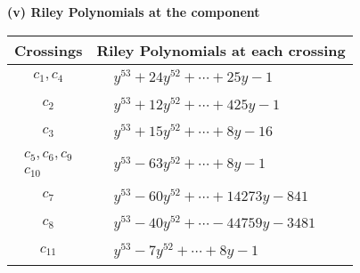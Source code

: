 \documentclass[1p]{elsarticle_modified}
\theoremstyle{definition}
\begin{document}
\newpage\renewcommand{\arraystretch}{1}
\flushleft \textbf{(v) Riley Polynomials at the component}\newline \\
\begin{tabular}{m{50pt}|m{274pt}}
Crossings & \hspace{64pt}Riley Polynomials at each crossing \\
\hline $$\begin{aligned}c_{1},c_{4}\end{aligned}$$&$\begin{aligned}
&y^{53}+24 y^{52}+\cdots+25 y-1
\end{aligned}$\\
\hline $$\begin{aligned}c_{2}\end{aligned}$$&$\begin{aligned}
&y^{53}+12 y^{52}+\cdots+425 y-1
\end{aligned}$\\
\hline $$\begin{aligned}c_{3}\end{aligned}$$&$\begin{aligned}
&y^{53}+15 y^{52}+\cdots+8 y-16
\end{aligned}$\\
\hline $$\begin{aligned}c_{5},c_{6},c_{9}\\c_{10}\end{aligned}$$&$\begin{aligned}
&y^{53}-63 y^{52}+\cdots+8 y-1
\end{aligned}$\\
\hline $$\begin{aligned}c_{7}\end{aligned}$$&$\begin{aligned}
&y^{53}-60 y^{52}+\cdots+14273 y-841
\end{aligned}$\\
\hline $$\begin{aligned}c_{8}\end{aligned}$$&$\begin{aligned}
&y^{53}-40 y^{52}+\cdots-44759 y-3481
\end{aligned}$\\
\hline $$\begin{aligned}c_{11}\end{aligned}$$&$\begin{aligned}
&y^{53}-7 y^{52}+\cdots+8 y-1
\end{aligned}$\\
\hline
\end{tabular}\\~\\
\end{document}
